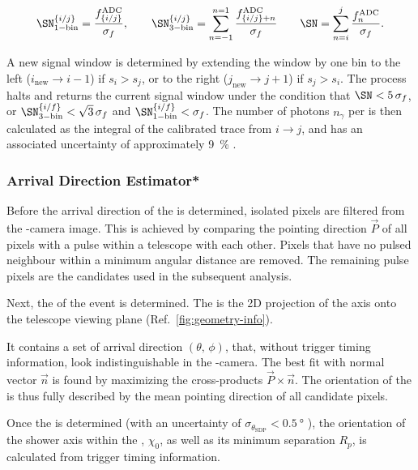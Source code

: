 \begin{equation}
\label{eq:pulse-finder-snr}
\SN^{\{i/j\}}_\mathrm{1-bin} = \frac{f^\mathrm{ADC}_{\{i/j\}}}{\sigma_f},
\qquad\SN^{\{i/j\}}_\mathrm{3-bin} = \sum\limits_{n=-1}^{n=1} \frac{f^\mathrm{ADC}_{\{i/j\} + n}}{\sigma_f} 
\qquad\SN = \sum\limits_{n=i}^{j} \frac{f^\mathrm{ADC}_n}{\sigma_f}.
\end{equation}

A new signal window is determined by extending the window by one bin to the
left ($i_\mathrm{new} \rightarrow i-1$) if $s_i > s_j$, or to the right 
($j_\mathrm{new} \rightarrow j+1$) if $s_j > s_i$. The process halts and 
returns the current signal window under the condition that $\SN< 5\,\sigma_f$,
or $\SN^{\{i/f\}}_\mathrm{3-bin} < \sqrt{3}\,\sigma_f$ and 
$\SN^{\{i/f\}}_\mathrm{1-bin} < \sigma_f$. The number of photons $n_\gamma$ 
per \PMT is then calculated as the integral of the calibrated trace from 
$i\rightarrow j$, and has an associated uncertainty of approximately 
\SI{9}{\percent} \cite{abrahamFluorescenceDetectorPierre2010}.

\subsubsection{Arrival Direction Estimator*}
\label{sssec:reconstruction-arrival-direction}

Before the arrival direction of the \EAS is determined, isolated pixels are 
filtered from the \FD-camera image. This is achieved by comparing the pointing 
direction $\vec{P}$ of all pixels with a \SLT pulse within a telescope with 
each other. Pixels that have no pulsed neighbour within a minimum angular 
distance are removed. The remaining pulse pixels are the candidates used in the
subsequent analysis.

Next, the \SDP of the event is determined. The \SDP is the 2D projection of 
the \EAS axis onto the telescope viewing plane (Ref.\ 
\cref{fig:geometry-info}).

It contains a set of arrival direction $(\theta,\,\phi)$, that, without trigger
timing information, look indistinguishable in the \FD-camera. The best fit 
\SDP with normal vector $\vec{n}$ is found by maximizing the cross-products 
$\vec{P}\times\vec{n}$. The orientation of the \SDP is thus fully described by 
the mean pointing direction of all candidate pixels.

Once the \SDP is determined (with an uncertainty of 
$\sigma_{\theta_\mathrm{SDP}} < \SI{0.5}{\degree}$ 
\cite{abrahamFluorescenceDetectorPierre2010}), the orientation of the shower 
axis within the \SDP, $\chi_0$, as well as its minimum separation $R_p$, is 
calculated from trigger timing information.

